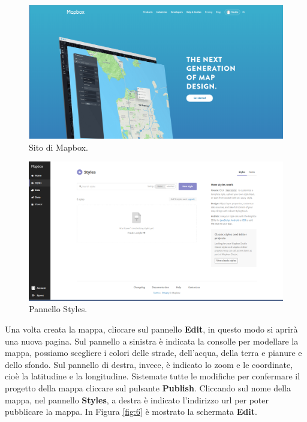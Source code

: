 \documentclass[a4paper,11pt]{article}
\begin{document}
\begin{figure}[htpb]
	\centering
	\includegraphics[scale=0.26]{Mapbox.png}
	\caption{Sito di Mapbox.}
	\label{fig:4}
\end{figure}
\begin{figure}[htpb]
	\centering
	\includegraphics[scale=0.26]{Styles.png}
	\caption{Pannello Styles.}
	\label{fig:5}
\end{figure}\newline
Una volta creata la mappa, cliccare sul pannello \textbf{Edit}, in questo modo si aprirà una nuova pagina.
Sul pannello  a sinistra è indicata la consolle per modellare la mappa, possiamo scegliere i colori delle strade, dell'acqua, della terra e pianure e dello sfondo.\newline
Sul pannello di destra, invece, è indicato lo zoom e le coordinate, cioè la latitudine e la longitudine. Sistemate tutte le modifiche per confermare il progetto della mappa cliccare sul pulsante \textbf{Publish}.
Cliccando sul nome della mappa, nel pannello \textbf{Styles}, a destra è indicato l'indirizzo url per poter pubblicare la mappa.
\newline
In Figura \ref{fig:6} è mostrato la schermata \textbf{Edit}.
\end{document}
